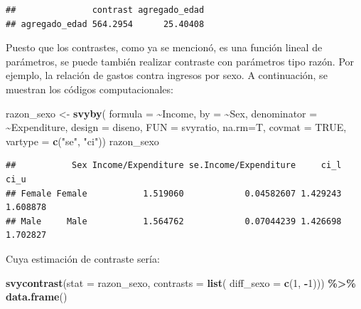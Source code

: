 \documentclass[
  12pt,
]{book}
\newenvironment{Shaded}{\begin{snugshade}}{\end{snugshade}}
\newcommand{\AttributeTok}[1]{\textcolor[rgb]{0.13,0.29,0.53}{#1}}
\newcommand{\ConstantTok}[1]{\textcolor[rgb]{0.56,0.35,0.01}{#1}}
\newcommand{\DecValTok}[1]{\textcolor[rgb]{0.00,0.00,0.81}{#1}}
\newcommand{\FunctionTok}[1]{\textcolor[rgb]{0.13,0.29,0.53}{\textbf{#1}}}
\newcommand{\NormalTok}[1]{#1}
\newcommand{\OtherTok}[1]{\textcolor[rgb]{0.56,0.35,0.01}{#1}}
\newcommand{\SpecialCharTok}[1]{\textcolor[rgb]{0.81,0.36,0.00}{\textbf{#1}}}
\newcommand{\StringTok}[1]{\textcolor[rgb]{0.31,0.60,0.02}{#1}}
\begin{document}
\begin{verbatim}
##               contrast agregado_edad
## agregado_edad 564.2954      25.40408
\end{verbatim}

Puesto que los contrastes, como ya se mencionó, es una función lineal de parámetros, se puede también realizar contraste con parámetros tipo razón. Por ejemplo, la relación de gastos contra ingresos por sexo. A continuación, se muestran los códigos computacionales:

\begin{Shaded}
\begin{Highlighting}[]
\NormalTok{razon\_sexo }\OtherTok{\textless{}{-}} \FunctionTok{svyby}\NormalTok{( }\AttributeTok{formula =} \SpecialCharTok{\textasciitilde{}}\NormalTok{Income,}
                     \AttributeTok{by =} \SpecialCharTok{\textasciitilde{}}\NormalTok{Sex,}
                     \AttributeTok{denominator =} \SpecialCharTok{\textasciitilde{}}\NormalTok{Expenditure,}
                     \AttributeTok{design =}\NormalTok{ diseno,}
                     \AttributeTok{FUN =}\NormalTok{ svyratio,}
                     \AttributeTok{na.rm=}\NormalTok{T, }\AttributeTok{covmat =} \ConstantTok{TRUE}\NormalTok{,}
                     \AttributeTok{vartype =} \FunctionTok{c}\NormalTok{(}\StringTok{"se"}\NormalTok{, }\StringTok{"ci"}\NormalTok{))}
\NormalTok{razon\_sexo}
\end{Highlighting}
\end{Shaded}

\begin{verbatim}
##           Sex Income/Expenditure se.Income/Expenditure     ci_l     ci_u
## Female Female           1.519060            0.04582607 1.429243 1.608878
## Male     Male           1.564762            0.07044239 1.426698 1.702827
\end{verbatim}

Cuya estimación de contraste sería:

\begin{Shaded}
\begin{Highlighting}[]
\FunctionTok{svycontrast}\NormalTok{(}\AttributeTok{stat =}\NormalTok{ razon\_sexo,}
            \AttributeTok{contrasts =} \FunctionTok{list}\NormalTok{(}
                             \AttributeTok{diff\_sexo =} \FunctionTok{c}\NormalTok{(}\DecValTok{1}\NormalTok{, }\SpecialCharTok{{-}}\DecValTok{1}\NormalTok{))) }\SpecialCharTok{\%\textgreater{}\%} \FunctionTok{data.frame}\NormalTok{()}
\end{Highlighting}
\end{Shaded}
\end{document}
